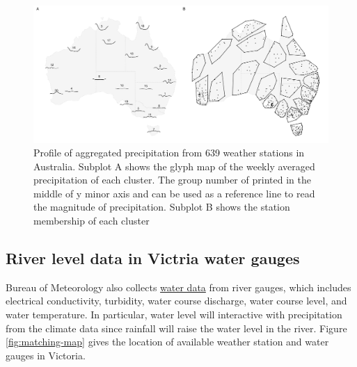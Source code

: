 \documentclass[
]{jss}
\begin{document}
\begin{CodeChunk}
\begin{figure}

{\centering \includegraphics[width=1\linewidth]{figures/basic-agg} 

}

\caption[Profile of aggregated precipitation from 639 weather stations in Australia]{Profile of aggregated precipitation from 639 weather stations in Australia. Subplot A shows the glyph map of the weekly averaged precipitation of each cluster. The group number of printed in the middle of y minor axis and can be used as a reference line to read the magnitude of precipitation. Subplot B shows the station membership of each cluster}\label{fig:basic-agg}
\end{figure}
\end{CodeChunk}

\hypertarget{river-level-data-in-victria-water-gauges}{%
\subsection{River level data in Victria water
gauges}\label{river-level-data-in-victria-water-gauges}}

Bureau of Meteorology also collects
\href{http://www.bom.gov.au/metadata/catalogue/19115/ANZCW0503900528?template=full}{water
data} from river gauges, which includes electrical conductivity,
turbidity, water course discharge, water course level, and water
temperature. In particular, water level will interactive with
precipitation from the climate data since rainfall will raise the water
level in the river. Figure \ref{fig:matching-map} gives the location of
available weather station and water gauges in Victoria.
\end{document}
